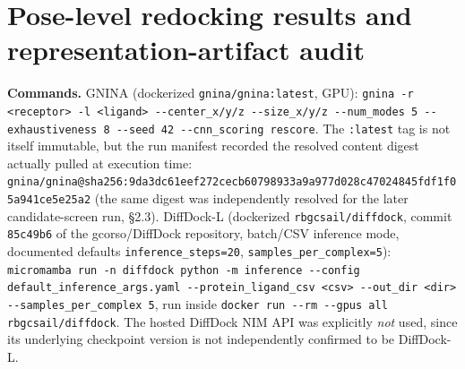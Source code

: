 \documentclass{article}
\begin{document}
\FloatBarrier
\section{Pose-level redocking results and representation-artifact audit}
\label{app:d}

\textbf{Commands.} GNINA (dockerized \texttt{gnina/gnina:latest}, GPU): \texttt{gnina -r <receptor> -l <ligand> -{}-center\_x/y/z -{}-size\_x/y/z -{}-num\_modes 5 -{}-exhaustiveness 8 -{}-seed 42 -{}-cnn\_scoring rescore}. The \texttt{:latest} tag is not itself immutable, but the run manifest recorded the resolved content digest actually pulled at execution time: \texttt{gnina/gnina@sha256:9da3dc61eef272cecb60798933a9a977d028c47024845fdf1f05a941ce5e25a2} (the same digest was independently resolved for the later candidate-screen run, \S2.3). DiffDock-L (dockerized \texttt{rbgcsail/diffdock}, commit \texttt{85c49b6} of the gcorso/DiffDock repository, batch/CSV inference mode, documented defaults \texttt{inference\_steps=20}, \texttt{samples\_per\_complex=5}): \texttt{micromamba run -n diffdock python -m inference -{}-config default\_inference\_args.yaml -{}-protein\_ligand\_csv <csv> -{}-out\_dir <dir> -{}-samples\_per\_complex 5}, run inside \texttt{docker run -{}-rm -{}-gpus all rbgcsail/diffdock}. The hosted DiffDock NIM API was explicitly \emph{not} used, since its underlying checkpoint version is not independently confirmed to be DiffDock-L.
\end{document}
